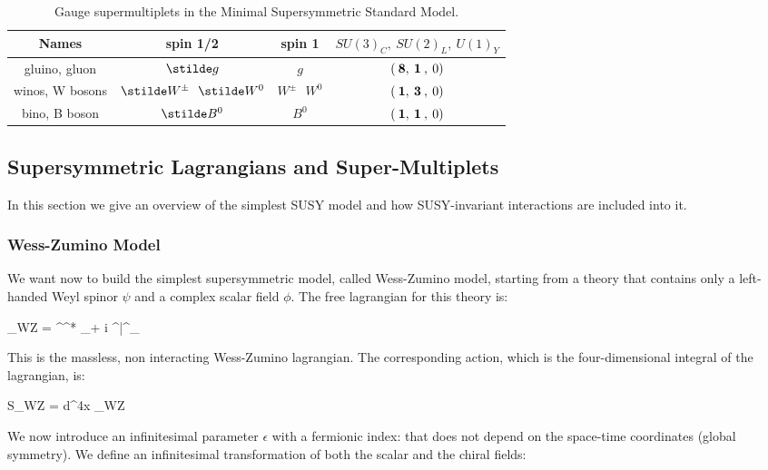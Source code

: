 \renewcommand{\arraystretch}{1.55}
\begin{table}[t]
\begin{center}
\begin{tabular}{c c c c}
\hline
Names & spin 1/2 & spin 1 & $SU(3)_C, \> SU(2)_L,\> U(1)_Y$\\
\hline\hline
gluino, gluon &$ \stilde g$& $g$ & $(\>{\bf 8},\>{\bf 1}\>,\> 0)$
\\
\hline
winos, W bosons & $ \stilde W^\pm\>\>\> \stilde W^0 $&
 $W^\pm\>\>\> W^0$ & $(\>{\bf 1},\>{\bf 3}\>,\> 0)$
\\
\hline
bino, B boson &$\stilde B^0$&
 $B^0$ & $(\>{\bf 1},\>{\bf 1}\>,\> 0)$
\\
\hline
\end{tabular}
\caption{Gauge supermultiplets in
the Minimal Supersymmetric Standard Model.\label{tab:gauge}}
\vspace{-0.45cm}
\end{center}
\end{table}


\subsection{Supersymmetric Lagrangians and Super-Multiplets}

In this section we give an overview of the simplest SUSY model and how SUSY-invariant interactions are included into it.

\subsubsection*{Wess-Zumino Model}

We want now to build the simplest supersymmetric model, called Wess-Zumino model, starting from a theory that contains only a left-handed Weyl spinor $\psi$ and a complex scalar field $\phi$. The free lagrangian for this theory is:

\beq
{}_{WZ} = \partial^\mu \phi^* \partial_\mu \phi + i \psi^\dagger \bar{\sigma}^\mu \partial_\mu \psi
\label{eq:WZL}
\eeq

This is the massless, non interacting Wess-Zumino lagrangian. The corresponding action, which is the four-dimensional integral of the lagrangian, is:

\beq
S_{WZ} = \int d^4x \; _{WZ}
\eeq

We now introduce an infinitesimal parameter $\epsilon$ with a fermionic index: 
that does not depend on the space-time coordinates (global symmetry). We define an infinitesimal transformation of both the scalar and the chiral fields:

